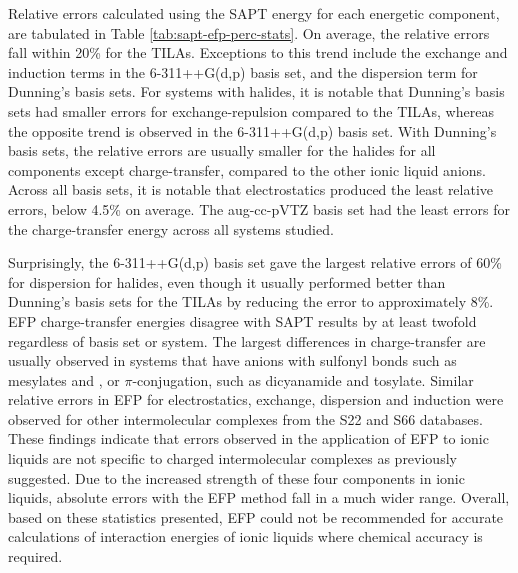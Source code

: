 Relative errors calculated using the SAPT energy for each energetic component, are tabulated in Table \ref{tab:sapt-efp-perc-stats}.
On average, the relative errors fall within 20\% for the TILAs. 
Exceptions to this trend include the exchange and induction terms in the 6-311++G(d,p) basis set, and the dispersion term for Dunning's basis sets.
For systems with halides, it is notable that Dunning's basis sets had smaller errors for exchange-repulsion compared to the TILAs, whereas the opposite trend is observed in the 6-311++G(d,p) basis set.
With Dunning's basis sets, the relative errors are usually smaller for the halides for all components except charge-transfer, compared to the other ionic liquid anions.
Across all basis sets, it is notable that electrostatics produced the least relative errors, below 4.5\% on average.
The aug-cc-pVTZ basis set had the least errors for the charge-transfer energy across all systems studied.


Surprisingly, the 6-311++G(d,p) basis set gave the largest relative errors of 60\% for dispersion for halides, even though it usually performed better than Dunning's basis sets for the TILAs by reducing the error to approximately 8\%.
EFP charge-transfer energies disagree with SAPT results by at least twofold regardless of basis set or system. 
The largest differences in charge-transfer are usually observed in systems that have anions with sulfonyl bonds such as mesylates and \ntf, or $\pi$-conjugation, such as dicyanamide and tosylate.
Similar relative errors in EFP for electrostatics, exchange, dispersion and induction were observed for other intermolecular complexes from the S22 and S66 databases.
\cite{Flick2012a}
These findings indicate that errors observed in the application of EFP to ionic liquids are not specific to charged intermolecular complexes as previously suggested.
Due to the increased strength of these four components in ionic liquids, absolute errors with the EFP method fall in a much wider range.
Overall, based on these statistics presented, EFP could not be recommended for accurate calculations of interaction energies of ionic liquids where chemical accuracy is required.
